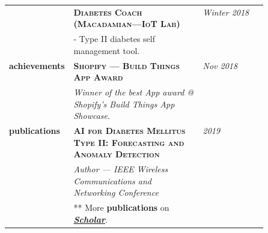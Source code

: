 \documentclass[9pt]{article}
\begin{document}
\begin{longtable}{@{}>{\raggedleft}p{0.25\linewidth}
                          p{}>{}p{0.25\linewidth}@{}}
            & \textbf{\textsc{Diabetes Coach (Macadamian---IoT Lab)}} & \textit{Winter 2018} \\
            & - Type II diabetes self management tool. \\ [1em]

        \textbf{achievements}
            & \textbf{\textsc{Shopify --- Build Things App Award}} & \textit{Nov 2018} \\
            & \textit{Winner of the best App award @ Shopify's Build Things App Showcase}. \\ [1em]

        \textbf{publications}
            & \textbf{\textsc{AI for Diabetes Mellitus Type II: Forecasting and Anomaly Detection}} & \textit{2019}\\
            & \textit{Author --- IEEE Wireless Communications and Networking Conference}  \\ [0.5em]
            & ** More \textbf{publications} on \textit{\href{https://scholar.google.ca/citations?user=zFDREhgAAAAJ\&hl=en}{\textbf{Scholar}}}.\\ [0.5em]


  \end{longtable}
\end{document}
